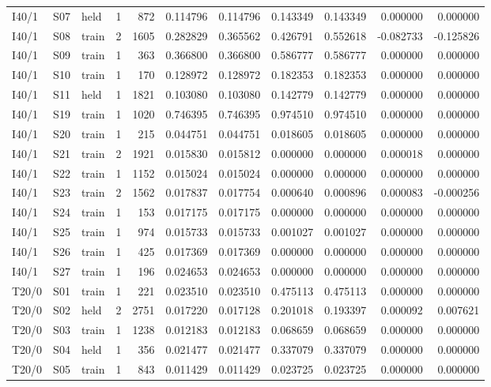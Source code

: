 \documentclass[10pt,a4paper]{article}
\begin{document}
{{\begin{longtable}{@{}lllrrrrrrrr@{}}
I40/1 & S07 & held & 1 & 872 & 0.114796 & 0.114796 & 0.143349 & 0.143349 & 0.000000 & 0.000000 \\
I40/1 & S08 & train & 2 & 1605 & 0.282829 & 0.365562 & 0.426791 & 0.552618 & -0.082733 & -0.125826 \\
I40/1 & S09 & train & 1 & 363 & 0.366800 & 0.366800 & 0.586777 & 0.586777 & 0.000000 & 0.000000 \\
I40/1 & S10 & train & 1 & 170 & 0.128972 & 0.128972 & 0.182353 & 0.182353 & 0.000000 & 0.000000 \\
I40/1 & S11 & held & 1 & 1821 & 0.103080 & 0.103080 & 0.142779 & 0.142779 & 0.000000 & 0.000000 \\
I40/1 & S19 & train & 1 & 1020 & 0.746395 & 0.746395 & 0.974510 & 0.974510 & 0.000000 & 0.000000 \\
I40/1 & S20 & train & 1 & 215 & 0.044751 & 0.044751 & 0.018605 & 0.018605 & 0.000000 & 0.000000 \\
I40/1 & S21 & train & 2 & 1921 & 0.015830 & 0.015812 & 0.000000 & 0.000000 & 0.000018 & 0.000000 \\
I40/1 & S22 & train & 1 & 1152 & 0.015024 & 0.015024 & 0.000000 & 0.000000 & 0.000000 & 0.000000 \\
I40/1 & S23 & train & 2 & 1562 & 0.017837 & 0.017754 & 0.000640 & 0.000896 & 0.000083 & -0.000256 \\
I40/1 & S24 & train & 1 & 153 & 0.017175 & 0.017175 & 0.000000 & 0.000000 & 0.000000 & 0.000000 \\
I40/1 & S25 & train & 1 & 974 & 0.015733 & 0.015733 & 0.001027 & 0.001027 & 0.000000 & 0.000000 \\
I40/1 & S26 & train & 1 & 425 & 0.017369 & 0.017369 & 0.000000 & 0.000000 & 0.000000 & 0.000000 \\
I40/1 & S27 & train & 1 & 196 & 0.024653 & 0.024653 & 0.000000 & 0.000000 & 0.000000 & 0.000000 \\
T20/0 & S01 & train & 1 & 221 & 0.023510 & 0.023510 & 0.475113 & 0.475113 & 0.000000 & 0.000000 \\
T20/0 & S02 & held & 2 & 2751 & 0.017220 & 0.017128 & 0.201018 & 0.193397 & 0.000092 & 0.007621 \\
T20/0 & S03 & train & 1 & 1238 & 0.012183 & 0.012183 & 0.068659 & 0.068659 & 0.000000 & 0.000000 \\
T20/0 & S04 & held & 1 & 356 & 0.021477 & 0.021477 & 0.337079 & 0.337079 & 0.000000 & 0.000000 \\
T20/0 & S05 & train & 1 & 843 & 0.011429 & 0.011429 & 0.023725 & 0.023725 & 0.000000 & 0.000000 \\

\end{longtable}}}
\end{document}
